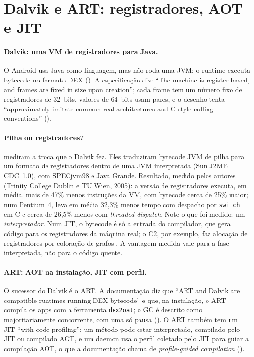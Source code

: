 \section{Dalvik e ART: registradores, AOT e JIT}
\label{sec:hist-dalvik}

\paragraph{Dalvik: uma VM de registradores para Java.}
O Android usa Java como linguagem, mas não roda uma JVM: o runtime
executa bytecode no formato DEX ().
A especificação diz: \enquote{The machine is
register-based, and frames are fixed in size upon creation}; cada frame
tem um número fixo de registradores de 32~bits, valores de 64~bits usam
pares, e o desenho tenta \enquote{approximately imitate common real
architectures and C-style calling conventions}
().

\paragraph{Pilha ou registradores?}
\textcite{paper:vm-showdown} mediram a troca que o Dalvik fez. Eles
traduziram bytecode JVM de pilha para um formato de registradores dentro
de uma JVM interpretada (Sun J2ME CDC~1.0), com SPECjvm98 e Java Grande.
Resultado, medido pelos autores (Trinity College Dublin e TU Wien, 2005):
a versão de registradores executa, em média, mais de 47\% menos
instruções da VM, com bytecode cerca de 25\% maior; num Pentium~4, leva
em média 32,3\% menos tempo com despacho por \texttt{switch} em C e cerca
de 26,5\% menos com \emph{threaded dispatch}. Note o que foi medido: um
\emph{interpretador}. Num JIT, o bytecode é só a entrada do compilador,
que gera código para os registradores da máquina real; o C2, por
exemplo, faz alocação de registradores por coloração de grafos
\parencite{paper:hotspot-server-compiler}. A vantagem medida vale para a
fase interpretada, não para o código quente.

\paragraph{ART: AOT na instalação, JIT com perfil.}
O sucessor do Dalvik é o ART. A documentação diz que \enquote{ART and
Dalvik are compatible runtimes running DEX bytecode} e que, na
instalação, o ART compila os apps com a ferramenta \texttt{dex2oat}; o GC
é descrito como majoritariamente concorrente, com uma só pausa
(). O ART também tem um JIT
\enquote{with code profiling}: um método pode estar interpretado,
compilado pelo JIT ou compilado AOT, e um daemon usa o perfil coletado
pelo JIT para guiar a compilação AOT, o que a documentação chama de
\emph{profile-guided compilation} ().

